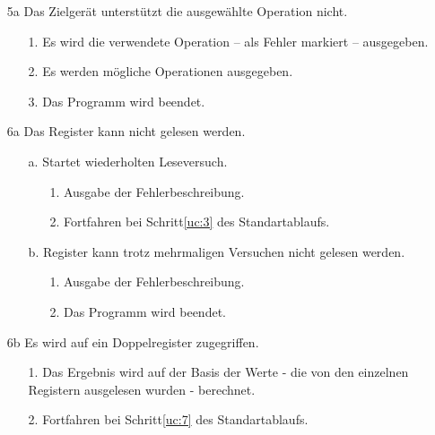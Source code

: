 \documentclass[Bachelorarbeit.tex]{subfiles}
\begin{document}
\begin{enumerate}
\begin{enumerate}
\end{enumerate}
%
\item[5a] Das Zielgerät unterstützt die ausgewählte Operation nicht.
\begin{enumerate}
\itemsep0em
\item[1.] Es wird die verwendete Operation – als Fehler markiert – ausgegeben.
\item[2.] Es werden mögliche Operationen ausgegeben.
\item[3.] Das Programm wird beendet.
\end{enumerate}
%
\item[6a] Das Register kann nicht gelesen werden.
\begin{enumerate}
\itemsep0em
\item[a.] Startet wiederholten Leseversuch.
	\begin{enumerate}
	\itemsep0em
	\item[1.] Ausgabe der Fehlerbeschreibung.
	\item[2.] Fortfahren bei Schritt\ref{uc:3} des Standartablaufs.
	\end{enumerate}
\item[b.] Register kann trotz mehrmaligen Versuchen nicht gelesen werden.
	\begin{enumerate}
	\itemsep0em
	\item[1.] Ausgabe der Fehlerbeschreibung.
	\item[2.] Das Programm wird beendet.
	\end{enumerate}
\end{enumerate}
%
\item[6b] Es wird auf ein Doppelregister zugegriffen.
\begin{enumerate}
\itemsep0em
\item[1.] Das Ergebnis wird auf der Basis der Werte - die von den einzelnen 
Registern ausgelesen wurden - berechnet.
\item[2.] Fortfahren bei Schritt\ref{uc:7} des Standartablaufs.
\end{enumerate}
%
\end{enumerate}	%
\end{document}
